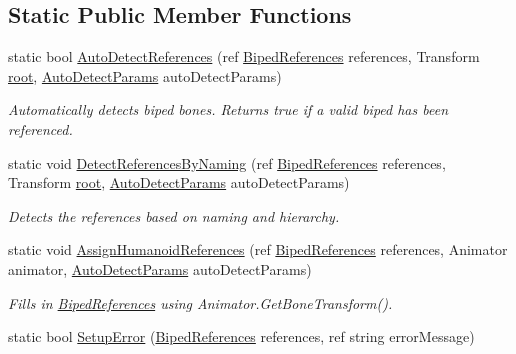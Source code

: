 \subsection*{Static Public Member Functions}
\begin{DoxyCompactItemize}
\item 
static bool \mbox{\hyperlink{class_root_motion_1_1_biped_references_a9a0ace986622d184c741e801651d05dd}{Auto\+Detect\+References}} (ref \mbox{\hyperlink{class_root_motion_1_1_biped_references}{Biped\+References}} references, Transform \mbox{\hyperlink{class_root_motion_1_1_biped_references_a9881cc2a81314b442244e08c5b7d62fc}{root}}, \mbox{\hyperlink{struct_root_motion_1_1_biped_references_1_1_auto_detect_params}{Auto\+Detect\+Params}} auto\+Detect\+Params)
\begin{DoxyCompactList}\small\item\em Automatically detects biped bones. Returns true if a valid biped has been referenced. \end{DoxyCompactList}\item 
static void \mbox{\hyperlink{class_root_motion_1_1_biped_references_a60c9580a2af294063ead6b0b8f6a0360}{Detect\+References\+By\+Naming}} (ref \mbox{\hyperlink{class_root_motion_1_1_biped_references}{Biped\+References}} references, Transform \mbox{\hyperlink{class_root_motion_1_1_biped_references_a9881cc2a81314b442244e08c5b7d62fc}{root}}, \mbox{\hyperlink{struct_root_motion_1_1_biped_references_1_1_auto_detect_params}{Auto\+Detect\+Params}} auto\+Detect\+Params)
\begin{DoxyCompactList}\small\item\em Detects the references based on naming and hierarchy. \end{DoxyCompactList}\item 
static void \mbox{\hyperlink{class_root_motion_1_1_biped_references_a4d9655d6418610e47e87a16df00dfe4a}{Assign\+Humanoid\+References}} (ref \mbox{\hyperlink{class_root_motion_1_1_biped_references}{Biped\+References}} references, Animator animator, \mbox{\hyperlink{struct_root_motion_1_1_biped_references_1_1_auto_detect_params}{Auto\+Detect\+Params}} auto\+Detect\+Params)
\begin{DoxyCompactList}\small\item\em Fills in \mbox{\hyperlink{class_root_motion_1_1_biped_references}{Biped\+References}} using Animator.\+Get\+Bone\+Transform(). \end{DoxyCompactList}\item 
static bool \mbox{\hyperlink{class_root_motion_1_1_biped_references_aa51cbda78013925d19b3eb540492f96b}{Setup\+Error}} (\mbox{\hyperlink{class_root_motion_1_1_biped_references}{Biped\+References}} references, ref string error\+Message)

\end{DoxyCompactItemize}

